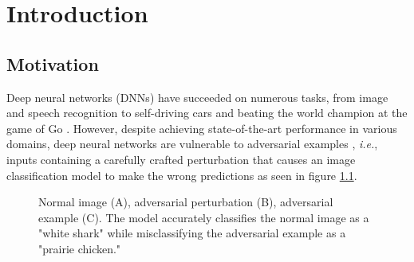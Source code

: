 \chapter{Introduction}
\label{Introduction}

\section{Motivation}

\overridetextsize
Deep neural networks (DNNs) have succeeded on numerous tasks, from image and
speech recognition \cite{russakovsky_imagenet_2015,amodei_deep_2015} to
self-driving cars \cite{bojarski_end_2016} and beating the world champion at
the game of Go \cite{silver_mastering_2016}. However, despite achieving
state-of-the-art performance in various domains, deep neural networks are
vulnerable to adversarial examples \cite{szegedy_intriguing_2014}, \emph{i.e.},
inputs containing a carefully crafted perturbation that causes an image
classification model to make the wrong predictions as seen in figure
\ref{fig:adversarial_examples}.

\begin{figure}[!htb]
    \centering
    \caption{Normal image (A), adversarial perturbation (B), adversarial
        example (C). The model accurately classifies the normal image as a
        "white shark" while misclassifying the adversarial example as a "prairie
        chicken."}
    \label{fig:adversarial_examples}
\end{figure}

